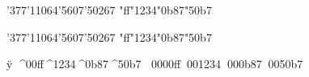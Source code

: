 \documentclass{minimal}
\begin{document}

    \char'377\char'11064\char'5607\char'50267
    \char"ff\char"1234\char"0b87\char"50b7

    \Uchar'377\Uchar'11064\Uchar'5607\Uchar'50267
    \Uchar"ff\Uchar"1234\Uchar"0b87\Uchar"50b7

    ^^ff
    ^^^^00ff^^^^1234^^^^0b87^^^^50b7
    ^^^^^^0000ff^^^^^^001234^^^^^^000b87^^^^^^0050b7
\end{document}
